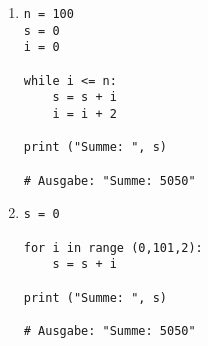 \begin{enumerate}

\item \begin{lstlisting}[label=KontrollstrukturenSolutionA]
n = 100
s = 0
i = 0

while i <= n:
    s = s + i
    i = i + 2
	
print ("Summe: ", s)

# Ausgabe: "Summe: 5050"
\end{lstlisting} 

\item \begin{lstlisting}[label=KontrollstrukturenSolutionB]	
s = 0

for i in range (0,101,2):
    s = s + i
    
print ("Summe: ", s)

# Ausgabe: "Summe: 5050"
\end{lstlisting} 

\end{enumerate}